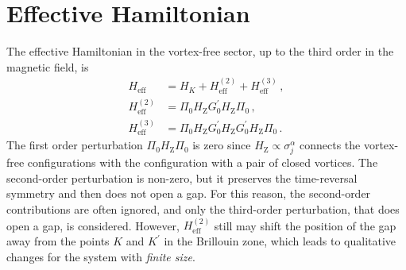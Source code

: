 \section{Effective Hamiltonian }


The effective Hamiltonian in the vortex-free sector, up to the third order in the magnetic field, is
\begin{align}
    H_{\text{eff}} &= H_{K} + H_{\text{eff}}^{(2)} +  H_{\text{eff}}^{(3)}  \, , \\[7pt]
    H_{\text{eff}}^{(2)}  &=  \Pi_0  H_{\text{Z}} G_0^{\prime} H_{\text{Z}} \Pi_0  \, , \\[7pt]
    H_{\text{eff}}^{(3)}  &=  \Pi_0  H_{\text{Z}} G_0^{\prime} H_{\text{Z}}  G_0^{\prime} H_{\text{Z}} \Pi_0 %
    \, .
\end{align}
The first order perturbation $\Pi_0  H_{\text{Z}}  \Pi_0$ is zero since $H_{\text{Z}} \propto \sigma^{\alpha}_j$ connects the vortex-free configurations with the configuration with a pair of closed vortices. The second-order perturbation is non-zero, but it preserves the time-reversal symmetry and then does not open a gap. For this reason, the second-order contributions are often ignored, and only the third-order perturbation, that does open a gap, is considered. However,  $ H_{\text{eff}}^{(2)} $ still may shift the position of the gap away from the points $K$ and $K^\prime$ in the Brillouin zone, which leads to {qualitative} changes for the system with \textit{finite size}.


